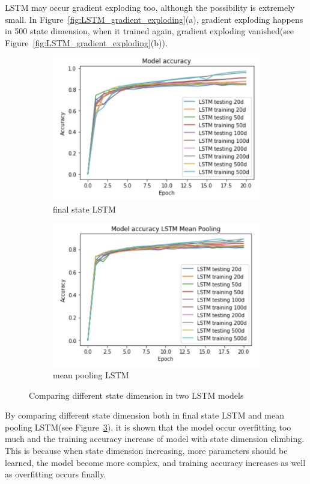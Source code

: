 \documentclass[12pt,letterpaper]{article}
\begin{document}
LSTM may occur gradient exploding too, although the possibility is extremely small. In Figure~\ref{fig:LSTM_gradient_exploding}(a), gradient exploding happens in 500 state dimension, when it trained again, gradient exploding vanished(see Figure~\ref{fig:LSTM_gradient_exploding}(b)).

\begin{figure}[h]
    \begin{subfigure}{0.49\textwidth}
    \includegraphics[width=\linewidth]{different_dim_lstm_final_state.png}
    \caption{\small final state LSTM} \label{fig:e}
    \end{subfigure}\hspace*{\fill}
    \begin{subfigure}{0.49\textwidth}
    \includegraphics[width=\linewidth]{different_dim_lstm_mean_pool_2.png}
    \caption{\small mean pooling LSTM} \label{fig:f}
    \end{subfigure}
    \caption{Comparing different state dimension in two LSTM models}
    \label{fig:LSTM_differ_state_dim}
\end{figure}

By comparing different state dimension both in final state LSTM and mean pooling LSTM(see Figure~\ref{fig:LSTM_differ_state_dim}), it is shown that the model occur overfitting too much and the training accuracy increase of model with state dimension climbing. This is because when state dimension increasing, more parameters should be learned, the model become more complex, and training accuracy increases as well as overfitting occurs finally. 
\end{document}
